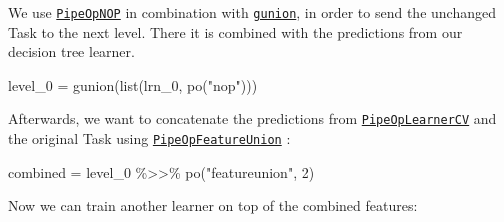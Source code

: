 \documentclass[
]{scrbook}
\newenvironment{Shaded}{\begin{snugshade}}{\end{snugshade}}
\newcommand{\AttributeTok}[1]{\textcolor[rgb]{0.77,0.63,0.00}{#1}}
\newcommand{\ConstantTok}[1]{\textcolor[rgb]{0.00,0.00,0.00}{#1}}
\newcommand{\DecValTok}[1]{\textcolor[rgb]{0.00,0.00,0.81}{#1}}
\newcommand{\FunctionTok}[1]{\textcolor[rgb]{0.00,0.00,0.00}{#1}}
\newcommand{\NormalTok}[1]{#1}
\newcommand{\OtherTok}[1]{\textcolor[rgb]{0.56,0.35,0.01}{#1}}
\newcommand{\SpecialCharTok}[1]{\textcolor[rgb]{0.00,0.00,0.00}{#1}}
\newcommand{\StringTok}[1]{\textcolor[rgb]{0.31,0.60,0.02}{#1}}
\renewenvironment{Shaded} {\begin{snugshade}\small} {\end{snugshade}}
\begin{document}
We use \href{https://mlr3pipelines.mlr-org.com/reference/mlr_pipeops_nop.html}{\texttt{PipeOpNOP}} in combination with \href{https://mlr3pipelines.mlr-org.com/reference/gunion.html}{\texttt{gunion}}, in order to send the unchanged Task to the next level.
There it is combined with the predictions from our decision tree learner.

\begin{Shaded}
\begin{Highlighting}[]
\NormalTok{level\_0 }\OtherTok{=} \FunctionTok{gunion}\NormalTok{(}\FunctionTok{list}\NormalTok{(lrn\_0, }\FunctionTok{po}\NormalTok{(}\StringTok{"nop"}\NormalTok{)))}
\end{Highlighting}
\end{Shaded}

Afterwards, we want to concatenate the predictions from \href{https://mlr3pipelines.mlr-org.com/reference/mlr_pipeops_learner_cv.html}{\texttt{PipeOpLearnerCV}} and the original Task using \href{https://mlr3pipelines.mlr-org.com/reference/mlr_pipeops_featureunion.html}{\texttt{PipeOpFeatureUnion}} :

\begin{Shaded}
\begin{Highlighting}[]
\NormalTok{combined }\OtherTok{=}\NormalTok{ level\_0 }\SpecialCharTok{\%\textgreater{}\textgreater{}\%} \FunctionTok{po}\NormalTok{(}\StringTok{"featureunion"}\NormalTok{, }\DecValTok{2}\NormalTok{)}
\end{Highlighting}
\end{Shaded}

Now we can train another learner on top of the combined features:

\begin{Shaded}
\end{Shaded}

\begin{Shaded}
\end{Shaded}
\end{document}
